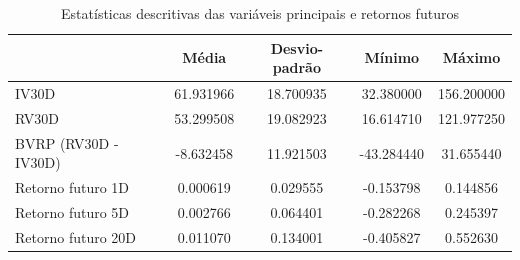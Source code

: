 \begin{table}
\caption{Estatísticas descritivas das variáveis principais e retornos futuros}
\label{tab:estatisticas_cap4}
\begin{tabular}{lcccc}
\toprule
 & Média & Desvio-padrão & Mínimo & Máximo \\
\midrule
IV30D & 61.931966 & 18.700935 & 32.380000 & 156.200000 \\
RV30D & 53.299508 & 19.082923 & 16.614710 & 121.977250 \\
BVRP (RV30D - IV30D) & -8.632458 & 11.921503 & -43.284440 & 31.655440 \\
Retorno futuro 1D & 0.000619 & 0.029555 & -0.153798 & 0.144856 \\
Retorno futuro 5D & 0.002766 & 0.064401 & -0.282268 & 0.245397 \\
Retorno futuro 20D & 0.011070 & 0.134001 & -0.405827 & 0.552630 \\
\bottomrule
\end{tabular}
\end{table}
